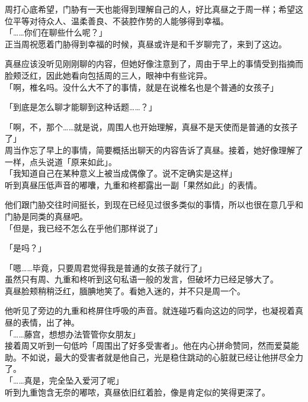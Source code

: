 周打心底希望，门胁有一天也能得到理解自己的人，好比真昼之于周一样；希望这位平等对待众人、温柔善良、不装腔作势的人能够得到幸福。\\

「……你们在聊些什么呢？」\\

正当周祝愿着门胁得到幸福的时候，真昼或许是和千岁聊完了，来到了这边。

真昼应该没听见刚刚聊的内容，但她好像注意到了，周由于早上的事情受到指摘而脸颊泛红，因此她看向包括周的三人，眼神中有些诧异。\\

「啊，椎名吗。没什么大不了的事情，就是在说椎名也是个普通的女孩子」

「到底是怎么聊才能聊到这种话题……？」

「啊，不，那个……就是说，周围人也开始理解，真昼不是天使而是普通的女孩子了」\\

周当作忘了早上的事情，简要概括出聊天的内容告诉了真昼。接着，她好像理解了一样，点头说道「原来如此」。\\

「我知道自己在某种意义上被当成偶像了。说不定确实是这样」\\

听到真昼压低声音的嘟囔，九重和柊都露出一副「果然如此」的表情。

他们跟门胁交往时间挺长，到现在已经见过很多类似的事情，所以也很在意几乎和门胁是同类的真昼吧。\\

「但是，我已经不怎么在乎他们那样说了」

「是吗？」

「嗯……毕竟，只要周君觉得我是普通的女孩子就行了」\\

虽然只有周、九重和柊听到这句私语一般的发言，但破坏力已经足够大了。\\

真昼脸颊稍稍泛红，腼腆地笑了。看她入迷的，并不只是周一个。

他听见了旁边的九重和柊屏住呼吸的声音。就连碰巧看向这边的同学，也凝视着真昼的表情，出了神。\\

「……藤宫，想想办法管管你女朋友」\\

接着周又听到一句低吟「周围出了好多受害者」。他在内心拼命赞同，然而爱莫能助。不如说，最大的受害者就是他自己，光是稳住跳动的心脏就已经让他拼尽全力了。\\

「……真是，完全坠入爱河了呢」\\

听到九重饱含无奈的嘟哝，真昼依旧红着脸，像是肯定似的笑得更深了。
